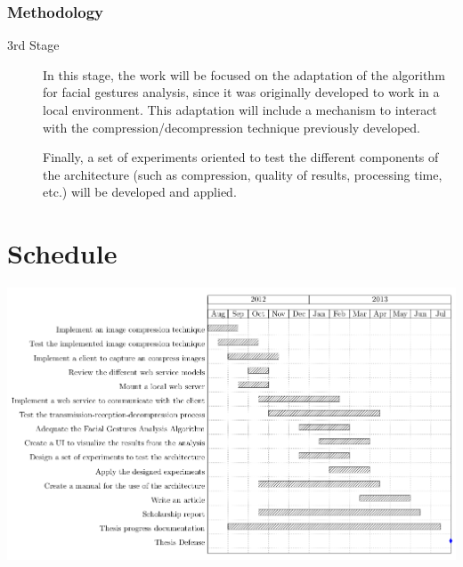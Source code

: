 \documentclass[compress]{beamer}
\begin{document}
\begin{frame}
	\frametitle{Methodology}
	\begin{description}
\item[3rd Stage] In this stage, the work will be focused on the adaptation of the algorithm for facial gestures analysis, since it was originally developed to work in a local environment. This adaptation will include a mechanism to interact with the compression/decompression technique previously developed.

Finally, a set of experiments oriented to test the different components of the architecture (such as compression, quality of results, processing time, etc.) will be developed and applied.
\end{description}
\end{frame}

\section{Schedule}
\begin{frame}
	\includegraphics[scale=0.30]{img/schedule.png}
\end{frame}
\end{document}
